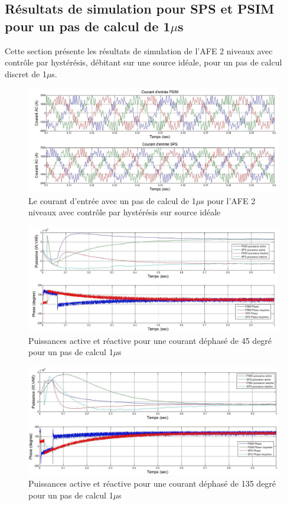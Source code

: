 \subsection{Résultats de simulation pour SPS et PSIM pour un pas de calcul de 1$\mu$s}
Cette section présente les résultats de simulation de l'AFE 2 niveaux avec contrôle par hystérésis, débitant sur une source idéale, pour un pas de calcul discret de 1$\mu$s. 


\begin{figure}[htb]
\centering
\includegraphics[scale=0.5]{fig/AFEIDEAL/CourantAC.jpg}
\caption{Le courant d'entrée avec un pas de calcul de 1$\mu$s pour l'AFE 2 niveaux avec contrôle par hystérésis sur source idéale}
\label{AF_I_cou}
\end{figure}



\begin{figure}[htb]
\centering
\includegraphics[scale=0.5]{fig/AFEIDEAL/pui45.jpg}
\caption{Puissances active et réactive pour une courant déphasé de 45 degré pour un pas de calcul 1$\mu$s}
\label{AF_I_pui_45}
\end{figure}

\begin{figure}[htb]
\centering
\includegraphics[scale=0.5]{fig/AFEIDEAL/pui135.jpg}
\caption{Puissances active et réactive pour une courant déphasé de 135 degré pour un pas de calcul 1$\mu$s}
\label{AF_I_pui_135}
\end{figure}

